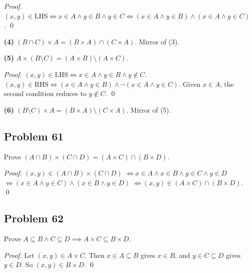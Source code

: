 \textit{Proof.} $(x,y) \in \text{LHS} \iff x \in A \land y \in B \land y \in C \iff (x \in A \land y \in B) \land (x \in A \land y \in C)$. \qed

\textbf{(4)} $(B \cap C) \times A = (B \times A) \cap (C \times A)$. Mirror of (3).

\textbf{(5)} $A \times (B \setminus C) = (A \times B) \setminus (A \times C)$.

\textit{Proof.} $(x,y) \in \text{LHS} \iff x \in A \land y \in B \land y \notin C$. $(x,y) \in \text{RHS} \iff (x \in A \land y \in B) \land \lnot(x \in A \land y \in C)$. Given $x \in A$, the second condition reduces to $y \notin C$. \qed

\textbf{(6)} $(B \setminus C) \times A = (B \times A) \setminus (C \times A)$. Mirror of (5).

\subsection*{Problem 61}
Prove $(A \cap B) \times (C \cap D) = (A \times C) \cap (B \times D)$.

\textit{Proof.}
$(x,y) \in (A \cap B) \times (C \cap D)$
$\iff x \in A \land x \in B \land y \in C \land y \in D$
$\iff (x \in A \land y \in C) \land (x \in B \land y \in D)$
$\iff (x,y) \in (A \times C) \cap (B \times D)$. \qed

\subsection*{Problem 62}
Prove $A \subseteq B \land C \subseteq D \implies A \times C \subseteq B \times D$.

\textit{Proof.} Let $(x,y) \in A \times C$. Then $x \in A \subseteq B$ gives $x \in B$, and $y \in C \subseteq D$ gives $y \in D$. So $(x,y) \in B \times D$. \qed
